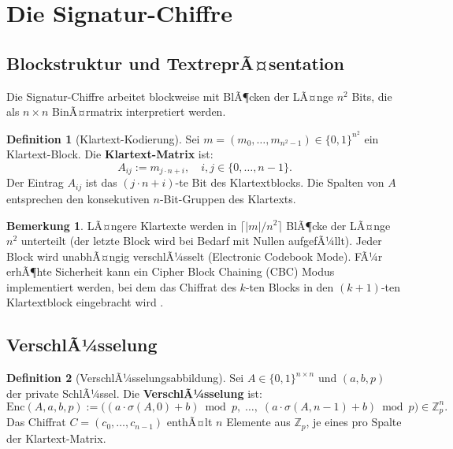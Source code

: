 ﻿\documentclass[a4paper,12pt]{scrreprt}
\theoremstyle{definition}
\newtheorem{definition}{Definition}[section]
\newtheorem{bemerkung}{Bemerkung}[section]
\begin{document}
\section{Die Signatur-Chiffre}

\subsection{Blockstruktur und TextreprÃ¤sentation}

Die Signatur-Chiffre arbeitet blockweise mit BlÃ¶cken der LÃ¤nge $n^2$ Bits, die als $n\times n$ BinÃ¤rmatrix interpretiert werden.

\begin{definition}[Klartext-Kodierung]
	\label{def:klartext}
	Sei $m = (m_0, \ldots, m_{n^2-1}) \in \{0,1\}^{n^2}$ ein Klartext-Block. Die \textbf{Klartext-Matrix} ist:
	\[
	A_{ij} := m_{j \cdot n + i}, \quad i, j \in \{0,\ldots,n-1\}.
	\]
	Der Eintrag $A_{ij}$ ist das $(j \cdot n + i)$-te Bit des Klartextblocks. Die Spalten von $A$ entsprechen den konsekutiven $n$-Bit-Gruppen des Klartexts.
\end{definition}

\begin{bemerkung}
	LÃ¤ngere Klartexte werden in $\lceil |m| / n^2 \rceil$ BlÃ¶cke der LÃ¤nge $n^2$ unterteilt (der letzte Block wird bei Bedarf mit Nullen aufgefÃ¼llt). Jeder Block wird unabhÃ¤ngig verschlÃ¼sselt (Electronic Codebook Mode). FÃ¼r erhÃ¶hte Sicherheit kann ein Cipher Block Chaining (CBC) Modus implementiert werden, bei dem das Chiffrat des $k$-ten Blocks in den $(k+1)$-ten Klartextblock eingebracht wird \cite{MvOV96}.
\end{bemerkung}

\subsection{VerschlÃ¼sselung}

\begin{definition}[VerschlÃ¼sselungsabbildung]
	\label{def:enc}
	Sei $A \in \{0,1\}^{n \times n}$ und $(a, b, p)$ der private SchlÃ¼ssel. Die \textbf{VerschlÃ¼sselung} ist:
	\[
	\mathrm{Enc}(A, a, b, p) := \bigl((a \cdot \sigma(A,0) + b) \bmod p,\;\ldots,\; (a \cdot \sigma(A,n-1) + b) \bmod p\bigr) \in \mathbb{Z}_p^n.
	\]
	Das Chiffrat $C = (c_0, \ldots, c_{n-1})$ enthÃ¤lt $n$ Elemente aus $\mathbb{Z}_p$, je eines pro Spalte der Klartext-Matrix.
\end{definition}
\end{document}
